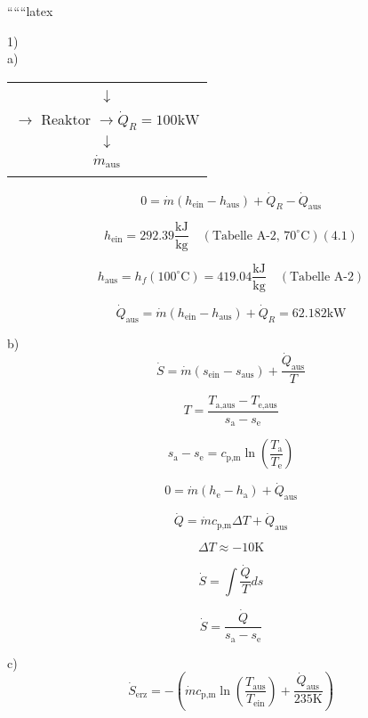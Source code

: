 
``````latex


1) \\
a) \\
\begin{center}
\begin{tabular}{|c|}
\hline
\begin{minipage}{0.4\textwidth}
\centering
\(\dot{m}_{\text{ein}}\) \\
\(\downarrow\) \\
\(\rightarrow\) Reaktor \(\rightarrow \dot{Q}_R = 100 \text{kW}\) \\
\(\downarrow\) \\
\(\dot{m}_{\text{aus}}\) \\
\end{minipage} \\
\hline
\end{tabular}
\end{center}

\[
0 = \dot{m} (h_{\text{ein}} - h_{\text{aus}}) + \dot{Q}_R - \dot{Q}_{\text{aus}}
\]

\[
h_{\text{ein}} = 292.39 \frac{\text{kJ}}{\text{kg}} \quad (\text{Tabelle A-2, 70}^\circ\text{C}) (4.1)
\]

\[
h_{\text{aus}} = h_f (100^\circ\text{C}) = 419.04 \frac{\text{kJ}}{\text{kg}} \quad (\text{Tabelle A-2})
\]

\[
\dot{Q}_{\text{aus}} = \dot{m} (h_{\text{ein}} - h_{\text{aus}}) + \dot{Q}_R = 62.182 \text{kW}
\]

b) \\
\[
\dot{S} = \dot{m} \left( s_{\text{ein}} - s_{\text{aus}} \right) + \frac{\dot{Q}_{\text{aus}}}{T}
\]

\[
T = \frac{T_{\text{a,aus}} - T_{\text{e,aus}}}{s_{\text{a}} - s_{\text{e}}}
\]

\[
s_{\text{a}} - s_{\text{e}} = c_{\text{p,m}} \ln \left( \frac{T_{\text{a}}}{T_{\text{e}}} \right)
\]

\[
0 = \dot{m} (h_{\text{e}} - h_{\text{a}}) + \dot{Q}_{\text{aus}}
\]

\[
\dot{Q} = \dot{m} c_{\text{p,m}} \Delta T + \dot{Q}_{\text{aus}}
\]

\[
\Delta T \approx -10 \text{K}
\]

\[
\dot{S} = \int \frac{\dot{Q}}{T} ds
\]

\[
\dot{S} = \frac{\dot{Q}}{s_{\text{a}} - s_{\text{e}}}
\]

c) \\
\[
\dot{S}_{\text{erz}} = - \left( \dot{m} c_{\text{p,m}} \ln \left( \frac{T_{\text{aus}}}{T_{\text{ein}}} \right) + \frac{\dot{Q}_{\text{aus}}}{235 \text{K}} \right)
\]

